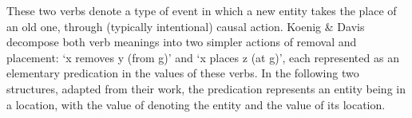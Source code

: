 \documentclass[output=paper,biblatex,babelshorthands,newtxmath,draftmode,colorlinks, citecolor=brown]{langscibook}
\begin{document}
\noindent
These two verbs denote a type of event in which a new entity takes the place of an old one, through (typically intentional) causal action.
Koenig \& Davis decompose both verb meanings into two simpler actions of removal and placement: `x removes y (from g)' and `x places z (at g)', each represented as an elementary predication in the  values of these verbs.  In the following two structures, adapted from their work, the  predication represents an entity being in a location, with the value of  denoting the entity and the value of  its location.


\end{document}
